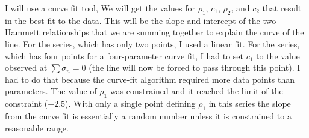 \documentclass{tufte-handout}
\begin{document}
I will use a curve fit tool, We will get the values for $\rho_1$, $c_1$, $\rho_2$, and $c_2$ that result in the best fit to the data. This will be the slope and intercept of the two Hammett relationships that we are summing together to explain the curve of the line. For the  series, which has only two points, I used a linear fit. For the  series, which has four points for a four-parameter curve fit, I had to set $c_1$ to the value observed at $\sum \sigma_n = 0$ (the line will now be forced to pass through this point). I had to do that because the curve-fit algorithm required more data points than parameters. The value of $\rho_1$ was constrained and it reached the limit of the constraint ($-2.5$). With only a single point defining $\rho_1$ in this series the slope from the curve fit is essentially a random number unless it is constrained to a reasonable range.
\end{document}
